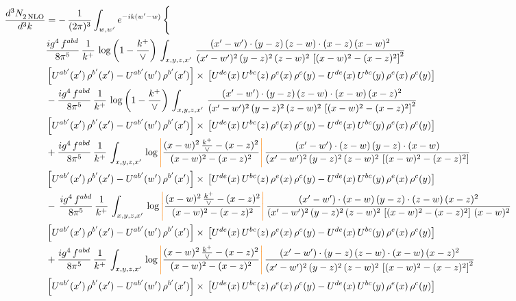 \documentclass[9pt]{article}
\numberwithin{equation}{section}
\begin{document}
\begin{align}
   \frac{d^{3}N_{2\,\rm NLO}^{\rm}}{d^{3}k}  & =  -\,\frac{1}{(2\pi)^{3}}  \int_{w, w^\prime} e^{-ik(w^\prime-w)}\, \Bigg\{\notag \\ &  \frac{ig^{4}\, f^{abd}}{8\pi^{5}}\, \frac{1}{k^{+}}\,\log{\left(1-\frac{k^{+}}{\vee}\right)}\, \int_{x,y,z,x'}\,\frac{(x'-w')\cdot  (y-z)\, (z-w)\cdot (x-z)\, (x-w)^{2}}{(x'-w')^{2}\, (y-z)^{2}\, (z-w)^{2}\,\left[(x-w)^{2}-(x-z)^{2}\right]^{2}}\, \notag \\ & \left[U^{ab'}(x')\,\rho^{b'}(x')-U^{ab'}(w')\, \rho^{b'}(x')\right]\times\,\left[U^{de}(x)\,U^{bc}(z)\, \rho^{e}(x)\,\rho^{c}(y)-U^{de}(x)\,U^{bc}(y)\,\rho^{e}(x)\,\rho^{c}(y)\right] \notag \\ &   - \frac{ig^{4}\, f^{abd}}{8\pi^{5}}\, \frac{1}{k^{+}}\,\log{\left(1-\frac{k^{+}}{\vee}\right)}\, \int_{x,y,z,x'}\,\frac{(x'-w')\cdot  (y-z)\, (z-w)\cdot (x-w)\, (x-z)^{2}}{(x'-w')^{2}\, (y-z)^{2}\, (z-w)^{2}\,\left[(x-w)^{2}-(x-z)^{2}\right]^{2}}\, \notag \\ & \left[U^{ab'}(x')\,\rho^{b'}(x')-U^{ab'}(w')\, \rho^{b'}(x')\right]\times\,\left[U^{de}(x)\,U^{bc}(z)\, \rho^{e}(x)\,\rho^{c}(y)-U^{de}(x)\,U^{bc}(y)\,\rho^{e}(x)\,\rho^{c}(y)\right] \notag \\
&  + \frac{ig^{4}\, f^{abd}}{8\pi^{5}}\, \frac{1}{k^{+}}\, \int_{x,y,z,x'}\,\log{\textcolor{orange}{\left|\textcolor{black}{\frac{(x-w)^{2}\,\frac{k^{+}}{\vee}-(x-z)^{2}}{(x-w)^{2}-(x-z)^{2}}}\right|}}\,\frac{(x'-w')\cdot (z-w)\, (y-z)\cdot (x-w)}{(x'-w')^{2}\, (y-z)^{2}\, (z-w)^{2}\,\left[(x-w)^{2}-(x-z)^{2}\right]}\, \notag \\ & \left[U^{ab'}(x')\,\rho^{b'}(x')-U^{ab'}(w')\, \rho^{b'}(x')\right]\times\,\left[U^{de}(x)\,U^{bc}(z)\, \rho^{e}(x)\,\rho^{c}(y)-U^{de}(x)\,U^{bc}(y)\,\rho^{e}(x)\,\rho^{c}(y)\right] \notag \\
& -\,\frac{ig^{4}\, f^{abd}}{8\pi^{5}}\, \frac{1}{k^{+}}\, \int_{x,y,z,x'}\,\log{\textcolor{orange}{\left|\textcolor{black}{\frac{(x-w)^{2}\,\frac{k^{+}}{\vee}-(x-z)^{2}}{(x-w)^{2}-(x-z)^{2}}}\right|}}\,\frac{(x'-w')\cdot (x-w)\, (y-z)\cdot(z-w)\,(x-z)^{2}}{(x'-w')^{2}\, (y-z)^{2}\, (z-w)^{2}\,\left[(x-w)^{2}-(x-z)^{2}\right]\,(x-w)^{2}}\, \notag \\ & \left[U^{ab'}(x')\,\rho^{b'}(x')-U^{ab'}(w')\, \rho^{b'}(x')\right]\times\,\left[U^{de}(x)\,U^{bc}(z)\, \rho^{e}(x)\,\rho^{c}(y)-U^{de}(x)\,U^{bc}(y)\,\rho^{e}(x)\,\rho^{c}(y)\right] \notag \\
& +\frac{ig^{4}\, f^{abd}}{8\pi^{5}}\, \frac{1}{k^{+}}\, \int_{x,y,z,x'}\,\log{\textcolor{orange}{\left|\textcolor{black}{\frac{(x-w)^{2}\,\frac{k^{+}}{\vee}-(x-z)^{2}}{(x-w)^{2}-(x-z)^{2}}}\right|}}\,\frac{(x'-w')\cdot  (y-z)\, (z-w)\cdot (x-w)\, (x-z)^{2}}{(x'-w')^{2}\, (y-z)^{2}\, (z-w)^{2}\,\left[(x-w)^{2}-(x-z)^{2}\right]^{2}}\, \notag \\ & \left[U^{ab'}(x')\,\rho^{b'}(x')-U^{ab'}(w')\, \rho^{b'}(x')\right]\times\,\left[U^{de}(x)\,U^{bc}(z)\, \rho^{e}(x)\,\rho^{c}(y)-U^{de}(x)\,U^{bc}(y)\,\rho^{e}(x)\,\rho^{c}(y)\right] \notag \\

\end{align}
\end{document}
